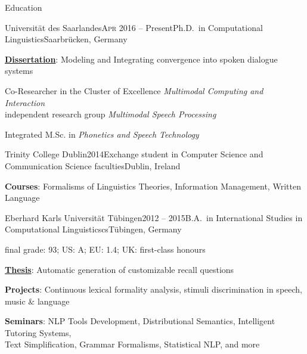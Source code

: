 \documentclass{resume} %
\begin{document}
\begin{rSection}{Education}

\begin{rSubsection}{Universität des Saarlandes}{\textsc{Apr} 2016 -- Present}{Ph.D.\ in Computational Linguistics}{Saarbrücken, Germany} %
	\setlength{\itemindent}{.7cm}
		
	\item \textbf{\underline{Dissertation}}: Modeling and Integrating convergence into spoken dialogue systems %

	\item Co-Researcher in the Cluster of Excellence \textit{Multimodal Computing and Interaction}
	\\\hspace*{.7cm}independent research group \textit{Multimodal Speech Processing}
	
	\item Integrated M.Sc. in \textit{Phonetics and Speech Technology}
\end{rSubsection}

\begin{rSubsection}{Trinity College Dublin}{2014}{Exchange student in Computer Science and Communication Science faculties}{Dublin, Ireland}
	\setlength{\itemindent}{.7cm}
	
	\item \textbf{Courses}: Formalisms of Linguistics Theories, Information Management, Written Language
	
\end{rSubsection}

\begin{rSubsection}{Eberhard Karls Universität Tübingen}{2012 -- 2015}{B.A.\ in International Studies in Computational Linguisticscs}{Tübingen, Germany}
	
\vspace*{-.2cm}
\item[]{\footnotesize final grade: 93; US: A; EU: 1.4; UK: first-class honours}
\vspace*{.2cm}

	\setlength{\itemindent}{.7cm}
	
	\item \textbf{\underline{Thesis}}: Automatic generation of customizable recall questions
	
	\item \textbf{Projects}: Continuous lexical formality analysis, stimuli discrimination in speech, music \& language
	
	\item \textbf{Seminars}: NLP Tools Development, Distributional Semantics, Intelligent Tutoring Systems, \\\hspace*{.7cm}Text Simplification, Grammar Formalisms, Statistical NLP, and more
\end{rSubsection}

\end{rSection}
\end{document}
